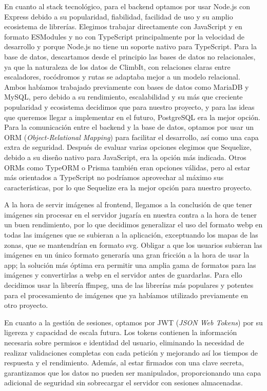En cuanto al stack tecnológico, para el backend optamos por usar Node.js con Express debido a su popularidad, fiabilidad, 
facilidad de uso y su amplio ecosistema de librerías. Elegimos trabajar directamente con JavaScript y en formato ESModules 
y no con TypeScript principalmente por la velocidad de desarrollo y porque Node.js no tiene un soporte nativo para TypeScript.
Para la base de datos, descartamos desde el principio las bases 
de datos no relacionales, ya que la naturaleza de los datos de ClimbIt, con relaciones claras entre escaladores, 
rocódromos y rutas se adaptaba mejor a un modelo relacional. Ambos habíamos trabajado previamente con bases de datos 
como MariaDB y MySQL, pero debido a su rendimiento, escalabilidad y su más que creciente popularidad y ecosistema 
decidimos que para nuestro proyecto, y para las ideas que queremos llegar a implementar en el futuro, PostgreSQL 
era la mejor opción. Para la comunicación entre el backend y la base de datos, optamos por usar un ORM 
(\textit{Object-Relational Mapping}) para facilitar el desarrollo, así como una capa extra de seguridad. Después de evaluar varias
opciones elegimos que Sequelize, debido a su diseño nativo para JavaScript, era la opción más indicada. Otros ORMs como 
TypeORM o Prisma también eran opciones válidas, pero al estar más orientados a TypeScript no podríamos aprovechar al máximo 
sus características, por lo que Sequelize era la mejor opción para nuestro proyecto.

A la hora de servir imágenes al frontend, llegamos a la conclusión de que tener imágenes sin procesar
en el servidor jugaría en nuestra contra a la hora de tener un buen rendimiento, por lo que decidimos generalizar el uso
del formato webp en todas las imágenes que se subieran a la aplicación, exceptuando los mapas de las zonas, 
que se mantendrían en formato svg. Obligar a que los usuarios subieran las imágenes en un único formato generaría 
una gran fricción a la hora de usar la app; la solución más óptima era permitir una amplia gama de formatos para las imágenes
y convertirlas a webp en el servidor antes de guardarlas. Para ello decidimos usar la librería ffmpeg, una de 
las librerías más populares y potentes para el procesamiento de imágenes que ya habíamos utilizado previamente en otro proyecto.

En cuanto a la gestión de sesiones, optamos por JWT (\textit{JSON Web Tokens}) por su 
ligereza y capacidad de escala futura. Los tokens contienen la información necesaria sobre 
permisos e identidad del usuario, eliminando la necesidad de realizar validaciones completas con cada petición 
y mejorando así los tiempos de respuesta y el rendimiento. Además, al estar firmados con una clave secreta, garantizamos 
que los datos no pueden ser manipulados, proporcionando una capa adicional de seguridad sin 
sobrecargar el servidor con sesiones almacenadas.

